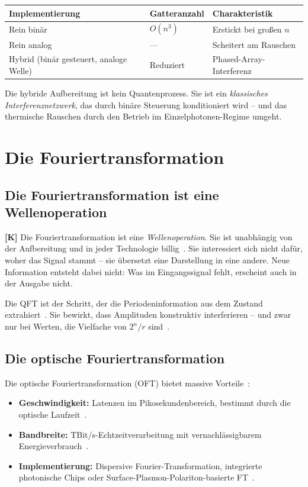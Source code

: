 \begin{center}
\begin{tabular}{lll}
\toprule
Implementierung & Gatteranzahl & Charakteristik \\
\midrule
Rein binär & $O(n^3)$ & Erstickt bei großen $n$ \\
Rein analog & --- & Scheitert am Rauschen \\
Hybrid (binär gesteuert, analoge Welle) & Reduziert & Phased-Array-Interferenz \\
\bottomrule
\end{tabular}
\end{center}

Die hybride Aufbereitung ist kein Quantenprozess. Sie ist ein
\emph{klassisches Interferenznetzwerk}, das durch binäre Steuerung
konditioniert wird -- und das thermische Rauschen durch den Betrieb
im Einzelphotonen-Regime umgeht.

\section{Die Fouriertransformation}
\label{sec:ft}

\subsection{Die Fouriertransformation ist eine Wellenoperation}

\textbf{[K]} Die Fouriertransformation ist eine \emph{Wellenoperation}.
Sie ist unabhängig von der Aufbereitung und in jeder Technologie
billig~\cite{Optica2021}. Sie interessiert sich nicht dafür, woher das
Signal stammt -- sie übersetzt eine Darstellung in eine andere. Neue
Information entsteht dabei nicht: Was im Eingangssignal fehlt,
erscheint auch in der Ausgabe nicht.

Die QFT ist der Schritt, der die Periodeninformation aus dem Zustand
extrahiert~\cite{Kumar2026}. Sie bewirkt, dass Amplituden konstruktiv
interferieren -- und zwar nur bei Werten, die Vielfache von $2^n/r$
sind~\cite{GitHub2026}.

\subsection{Die optische Fouriertransformation}

Die optische Fouriertransformation (OFT) bietet massive
Vorteile~\cite{Optica2021, Wang2022}:

\begin{itemize}
  \item \textbf{Geschwindigkeit:} Latenzen im Pikosekundenbereich,
    bestimmt durch die optische Laufzeit~\cite{Optica2021}.
  \item \textbf{Bandbreite:} TBit/s-Echtzeitverarbeitung mit
    vernachlässigbarem Energieverbrauch~\cite{Optica2021}.
  \item \textbf{Implementierung:} Dispersive Fourier-Transformation,
    integrierte photonische Chips oder Surface-Plasmon-Polariton-basierte
    FT~\cite{Optica2021}.
\end{itemize}

